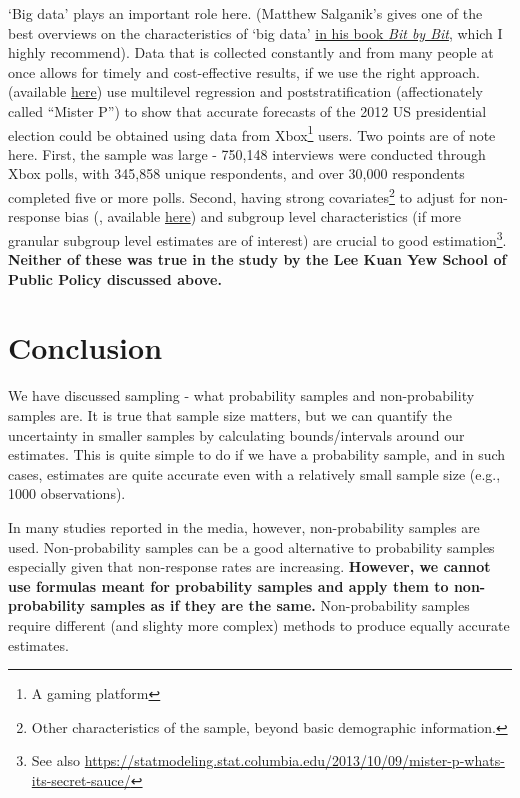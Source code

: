 \documentclass[openany]{book}
\let\rmarkdownfootnote\footnote%
\def\footnote{\protect\rmarkdownfootnote}
\begin{document}
`Big data' plays an important role here. (Matthew Salganik's gives one
of the best overviews on the characteristics of `big data'
\href{https://www.bitbybitbook.com/en/1st-ed/observing-behavior/characteristics/}{in
his book \emph{Bit by Bit}}, which I highly recommend). Data that is
collected constantly and from many people at once allows for timely and
cost-effective results, if we use the right approach.
\citet{wang_forecasting_2015} (available
\href{http://www.stat.columbia.edu/~gelman/research/published/forecasting-with-nonrepresentative-polls.pdf}{here})
use multilevel regression and poststratification (affectionately called
``Mister P'') to show that accurate forecasts of the 2012 US
presidential election could be obtained using data from Xbox\footnote{A
  gaming platform} users. Two points are of note here. First, the sample
was large - 750,148 interviews were conducted through Xbox polls, with
345,858 unique respondents, and over 30,000 respondents completed five
or more polls. Second, having strong covariates\footnote{Other
  characteristics of the sample, beyond basic demographic information.}
to adjust for non-response bias (\citet{gelman_mythical_2016}, available
\href{http://www.stat.columbia.edu/~gelman/research/published/swingers.pdf}{here})
and subgroup level characteristics (if more granular subgroup level
estimates are of interest) are crucial to good estimation\footnote{See
  also
  \url{https://statmodeling.stat.columbia.edu/2013/10/09/mister-p-whats-its-secret-sauce/}}.
\textbf{Neither of these was true in the study by the Lee Kuan Yew
School of Public Policy discussed above.}

\section{Conclusion}\label{conclusion-2}

We have discussed sampling - what probability samples and
non-probability samples are. It is true that sample size matters, but we
can quantify the uncertainty in smaller samples by calculating
bounds/intervals around our estimates. This is quite simple to do if we
have a probability sample, and in such cases, estimates are quite
accurate even with a relatively small sample size (e.g., 1000
observations).

In many studies reported in the media, however, non-probability samples
are used. Non-probability samples can be a good alternative to
probability samples especially given that non-response rates are
increasing. \textbf{However, we cannot use formulas meant for
probability samples and apply them to non-probability samples as if they
are the same.} Non-probability samples require different (and slighty
more complex) methods to produce equally accurate estimates.
\end{document}
